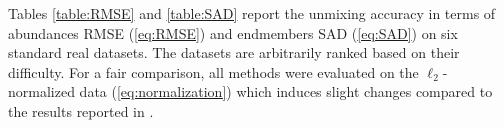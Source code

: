 \begin{figure}[h]
  \centering
  \hfil
  \caption{}
  \label{fig:WDC}
\end{figure}

Tables \ref{table:RMSE} and \ref{table:SAD} report the unmixing accuracy in
terms of abundances RMSE (\ref{eq:RMSE}) and endmembers SAD (\ref{eq:SAD}) on
six standard real datasets.
The datasets are arbitrarily ranked based on their difficulty.
For a fair comparison, all methods were evaluated on the $\ell_2$-normalized
data (\ref{eq:normalization}) which induces slight changes compared to the
results reported in \cite{rasti_misicnet_2022}.

